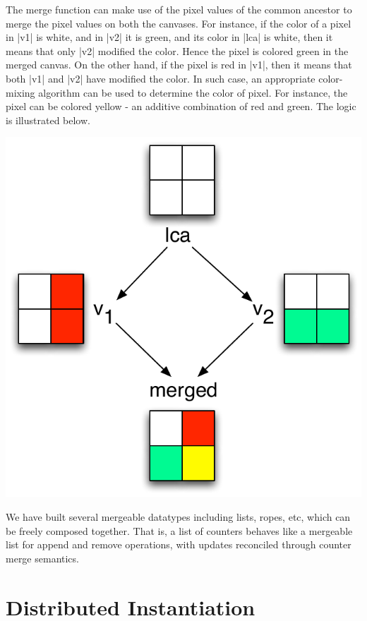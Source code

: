 \documentclass[twocolumn,9pt]{extarticle}
\begin{document}
The merge function can make use of the pixel values of the common ancestor to
merge the pixel values on both the canvases. For instance, if the color of a
pixel in |v1| is white, and in |v2| it is green, and its color in |lca|
is white, then it means that only |v2| modified the color. Hence the pixel is
colored green in the merged canvas. On the other hand, if the pixel is red in
|v1|, then it means that both |v1| and |v2| have modified the color. In
such case, an appropriate color-mixing algorithm can be used to determine the
color of pixel.  For instance, the pixel can be colored yellow - an additive
combination of red and green. The logic is illustrated below.

\vspace*{-0.1in}
\begin{center}
\includegraphics[scale=0.35]{Figures/canvas-merging}
\end{center}
\vspace*{-0.1in}

We have built several mergeable datatypes including lists, ropes, etc, which
can be freely composed together. That is, a list of counters behaves like a
mergeable list for append and remove operations, with updates reconciled
through counter merge semantics.

\section{Distributed Instantiation}
\end{document}
